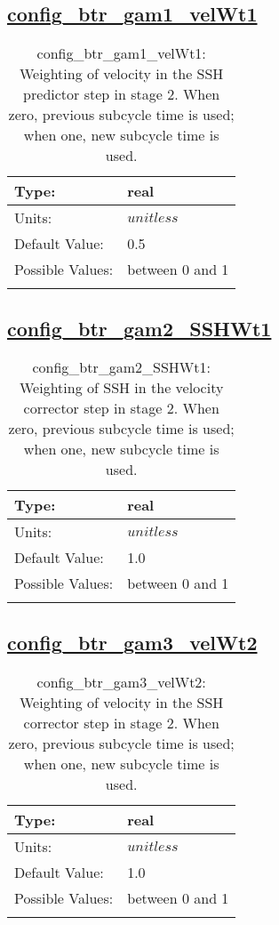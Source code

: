\subsection[config\_btr\_gam1\_velWt1]{\hyperref[sec:nm_tab_split_explicit_ts]{config\_btr\_gam1\_velWt1}}
\label{subsec:nm_sec_config_btr_gam1_velWt1}
\begin{center}
\begin{longtable}{| p{2.0in} || p{4.0in} |}
    \hline
    Type: & real \\
    \hline
    Units: & $unitless$ \\
    \hline
    Default Value: & 0.5 \\
    \hline
    Possible Values: & between 0 and 1 \\
    \hline
    \caption{config\_btr\_gam1\_velWt1: Weighting of velocity in the SSH predictor step in stage 2. When zero, previous subcycle time is used; when one, new subcycle time is used.}
\end{longtable}
\end{center}
\subsection[config\_btr\_gam2\_SSHWt1]{\hyperref[sec:nm_tab_split_explicit_ts]{config\_btr\_gam2\_SSHWt1}}
\label{subsec:nm_sec_config_btr_gam2_SSHWt1}
\begin{center}
\begin{longtable}{| p{2.0in} || p{4.0in} |}
    \hline
    Type: & real \\
    \hline
    Units: & $unitless$ \\
    \hline
    Default Value: & 1.0 \\
    \hline
    Possible Values: & between 0 and 1 \\
    \hline
    \caption{config\_btr\_gam2\_SSHWt1: Weighting of SSH in the velocity corrector step in stage 2. When zero, previous subcycle time is used; when one, new subcycle time is used.}
\end{longtable}
\end{center}
\subsection[config\_btr\_gam3\_velWt2]{\hyperref[sec:nm_tab_split_explicit_ts]{config\_btr\_gam3\_velWt2}}
\label{subsec:nm_sec_config_btr_gam3_velWt2}
\begin{center}
\begin{longtable}{| p{2.0in} || p{4.0in} |}
    \hline
    Type: & real \\
    \hline
    Units: & $unitless$ \\
    \hline
    Default Value: & 1.0 \\
    \hline
    Possible Values: & between 0 and 1 \\
    \hline
    \caption{config\_btr\_gam3\_velWt2: Weighting of velocity in the SSH corrector step in stage 2. When zero, previous subcycle time is used; when one, new subcycle time is used.}
\end{longtable}
\end{center}
